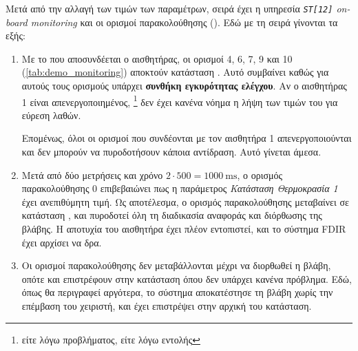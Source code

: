 \documentclass[a4paper,nobib]{tufte-book}
\begin{document}
Μετά από την αλλαγή των τιμών των παραμέτρων, σειρά έχει η υπηρεσία \emph{\texttt{ST[12]} on-board monitoring} και οι ορισμοί παρακολούθησης (). Εδώ με τη σειρά γίνονται τα εξής:
\begin{enumerate}
	\item Με το που αποσυνδέεται ο αισθητήρας, οι ορισμοί 4, 6, 7, 9 και 10 (\cref{tab:demo_monitoring}) αποκτούν κατάσταση \invalid. Αυτό συμβαίνει καθώς για αυτούς τους ορισμούς υπάρχει \textbf{συνθήκη εγκυρότητας ελέγχου}. Αν ο αισθητήρας 1 είναι απενεργοποιημένος, \footnote{είτε λόγω προβλήματος, είτε λόγω εντολής} δεν έχει κανένα νόημα η λήψη των τιμών του για εύρεση λαθών.
	
	Επομένως, όλοι οι ορισμοί που συνδέονται με τον αισθητήρα 1 απενεργοποιούνται και δεν μπορούν να πυροδοτήσουν κάποια αντίδραση. Αυτό γίνεται άμεσα.
	\item Μετά από δύο μετρήσεις και χρόνο \( 2 \cdot 500 = \SI{1000}{\milli\second} \), ο ορισμός παρακολούθησης 0 επιβεβαιώνει πως η παράμετρος \emph{Κατάσταση Θερμοκρασία 1} έχει ανεπιθύμητη τιμή. Ως αποτέλεσμα, ο ορισμός παρακολούθησης μεταβαίνει σε κατάσταση \unexpected, και πυροδοτεί όλη τη διαδικασία αναφοράς και διόρθωσης της βλάβης. Η αποτυχία του αισθητήρα έχει πλέον εντοπιστεί, και το σύστημα \acs{FDIR} έχει αρχίσει να δρα.
	\item Οι ορισμοί παρακολούθησης δεν μεταβάλλονται μέχρι να διορθωθεί η βλάβη, οπότε και επιστρέφουν στην κατάσταση \ok όπου δεν υπάρχει κανένα πρόβλημα. Εδώ, όπως θα περιγραφεί αργότερα, το σύστημα αποκατέστησε τη βλάβη χωρίς την επέμβαση του χειριστή, και έχει επιστρέψει στην αρχική του κατάσταση.
\end{enumerate}
\end{document}
